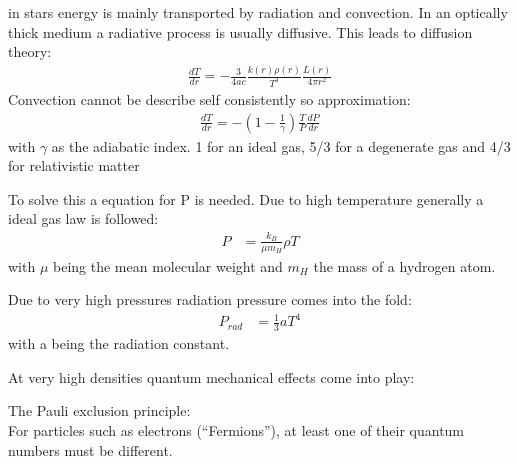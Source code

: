 \documentclass[11pt,a4paper]{article}
\begin{document}
\begin{itemize}
    in stars energy is mainly transported by radiation and convection. 
    In an optically thick medium a radiative process is usually diffusive.
    This leads to diffusion theory: 
    \begin{align*}
        \frac {dT} {dr} = - \frac {3} {4 a c} \frac {k(r) \rho (r)} {T^3} \frac {L(r)}{4 \pi r^2} 
    \end{align*}
    Convection cannot be describe self consistently so approximation: 
    \begin{align*}
        \frac {dT} {dr} = -(1 - \frac {1}{\gamma}) \frac T P \frac {dP}{dr}
    \end{align*}
    with $\gamma$ as the adiabatic index. 
    1 for an ideal gas, 5/3 for a degenerate gas and 4/3 for relativistic matter
\end{itemize}
To solve this a equation for P is needed. 
Due to high temperature generally a ideal gas law is followed: 
\begin{align*}
    P &= \frac {k_B}{\mu m_H} \rho T 
\end{align*}
with $\mu$ being the mean molecular weight and $m_H$ the mass of a hydrogen atom.

Due to very high pressures radiation pressure comes into the fold: 
\begin{align*}
    P_{rad} &= \frac 1 3 a T^4 
\end{align*}
with a being the radiation constant.

At very high densities quantum mechanical effects come into play: 

The Pauli exclusion principle: \\
For particles such as electrons (“Fermions”), at least one of their quantum numbers must be different.
\end{document}
